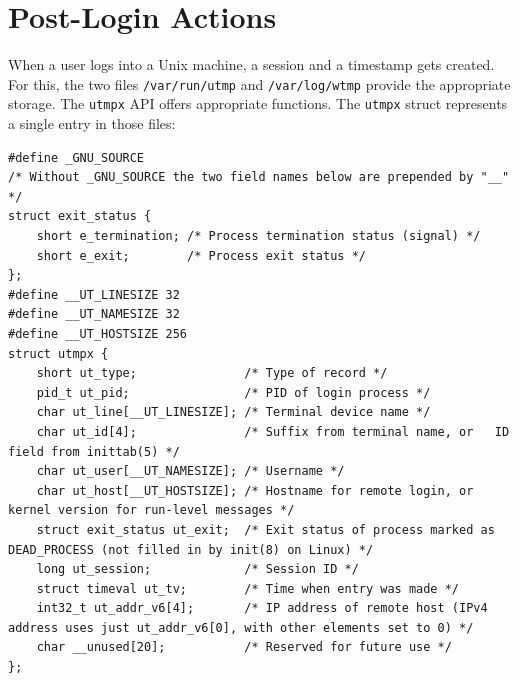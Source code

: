 \documentclass[10pt,a4paper,titlepage,twoside,english,final]{zhawreprt}
\begin{document}
\section{Post-Login Actions}\label{sec:PostLoginActions}
When a user logs into a \gls{Unix} machine, a session and a timestamp gets created.\\
For this, the two files \texttt{/var/run/utmp} and \texttt{/var/log/wtmp} provide the appropriate storage. The \texttt{utmpx} \gls{API} offers appropriate functions. The \texttt{utmpx} struct represents a single entry in those files:
\setlistingC
\begin{lstlisting}[caption={Definition of the utmpx structure {\citep[p.819]{KerriskTLPI}}},label=lst:UtmpxDefinition]
#define _GNU_SOURCE
/* Without _GNU_SOURCE the two field names below are prepended by "__" */
struct exit_status {
	short e_termination; /* Process termination status (signal) */
	short e_exit; 		 /* Process exit status */
};
#define __UT_LINESIZE 32
#define __UT_NAMESIZE 32
#define __UT_HOSTSIZE 256
struct utmpx {
	short ut_type; 				 /* Type of record */
	pid_t ut_pid; 				 /* PID of login process */
	char ut_line[__UT_LINESIZE]; /* Terminal device name */
	char ut_id[4]; 				 /* Suffix from terminal name, or	ID field from inittab(5) */
	char ut_user[__UT_NAMESIZE]; /* Username */
	char ut_host[__UT_HOSTSIZE]; /* Hostname for remote login, or kernel version for run-level messages */
	struct exit_status ut_exit;  /* Exit status of process marked as DEAD_PROCESS (not filled in by init(8) on Linux) */
	long ut_session; 			 /* Session ID */
	struct timeval ut_tv; 		 /* Time when entry was made */
	int32_t ut_addr_v6[4]; 		 /* IP address of remote host (IPv4 address uses just ut_addr_v6[0], with other elements set to 0) */
	char __unused[20]; 			 /* Reserved for future use */
};
\end{lstlisting}
\end{document}
